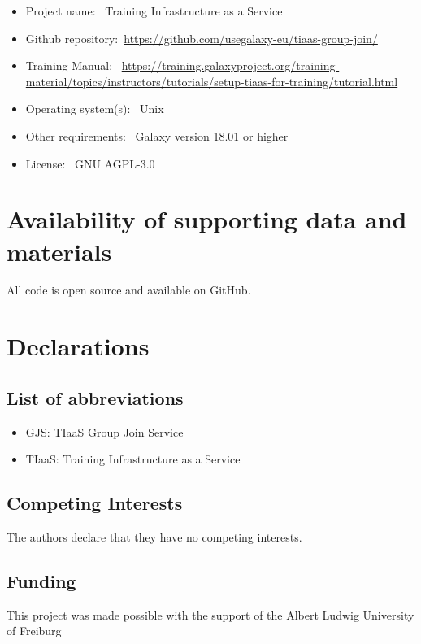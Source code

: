 \documentclass[a4paper,num-refs]{oup-contemporary}
\begin{document}
\begin{itemize}
\item Project name: ~Training Infrastructure as a Service
\item Github repository:~\url{https://github.com/usegalaxy-eu/tiaas-group-join/}
\item Training Manual: ~\url{https://training.galaxyproject.org/training-material/topics/instructors/tutorials/setup-tiaas-for-training/tutorial.html}
\item Operating system(s): ~Unix
\item Other requirements: ~Galaxy version 18.01 or higher
\item License: ~GNU AGPL-3.0
\end{itemize}

\section{Availability of supporting data and materials}
All code is open source and available on GitHub.

\section{Declarations}

\subsection{List of abbreviations}

\begin{itemize}
\item GJS: TIaaS Group Join Service
\item TIaaS: Training Infrastructure as a Service
\end{itemize}


\subsection{Competing Interests}
The authors declare that they have no competing interests.


\subsection{Funding}
This project was made possible with the support of the Albert Ludwig University of Freiburg
\end{document}
